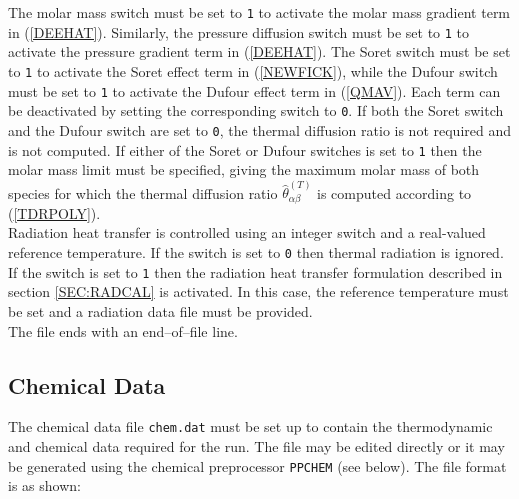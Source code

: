\documentclass[dvips]{article}
\begin{document}
The molar mass switch must be set to {\tt 1} to activate
the molar mass gradient term in (\ref{DEEHAT}).  Similarly,
the pressure diffusion switch must be set to {\tt 1} to activate
the pressure gradient term in (\ref{DEEHAT}).  
The Soret switch must be set to {\tt 1} to activate
the Soret effect term in (\ref{NEWFICK}), while  
the Dufour switch must be set to {\tt 1} to activate
the Dufour effect term in (\ref{QMAV}).  Each term can be deactivated by
setting the corresponding switch to {\tt 0}.  If both the Soret
switch and the Dufour switch are set to {\tt 0}, the thermal diffusion ratio is
not required and is not computed.  If either of the Soret or Dufour switches is
set to {\tt 1} then the molar mass limit must be specified, giving the maximum
molar mass of both species for which the thermal diffusion ratio
$\hat{\theta}_{\alpha\beta}^{(T)}$ is computed according to (\ref{TDRPOLY}).\\

\noindent
Radiation heat transfer is controlled using an integer switch and a
real-valued reference temperature.  If the
switch is set to {\tt 0} then thermal radiation is ignored.  If the switch is
set to {\tt 1} then the radiation heat transfer formulation described in
section \ref{SEC:RADCAL} is activated.  In this case, the reference
temperature must be set and a radiation data file must be provided.\\

\noindent
The file ends with an end--of--file line.

\subsection{Chemical Data}
The chemical data file {\tt chem.dat} must be set up to contain the
thermodynamic and chemical data required for the run.  The file may be 
edited directly or it may be generated using the chemical preprocessor
{\tt PPCHEM} (see below).  The file format is as shown:
\end{document}
